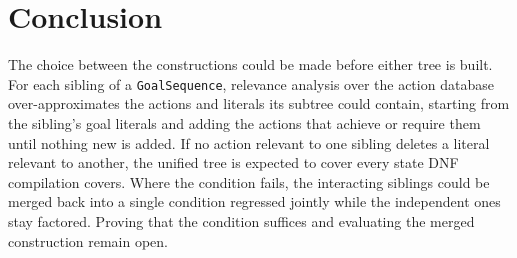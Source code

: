 \chapter{Conclusion}
\label{ch:conclusion}
    The choice between the constructions could be made before either tree is built.
    For each sibling of a \texttt{GoalSequence}, relevance analysis over the action database over-approximates the actions and literals its subtree could contain, starting from the sibling's goal literals and adding the actions that achieve or require them until nothing new is added.
    If no action relevant to one sibling deletes a literal relevant to another, the unified tree is expected to cover every state DNF compilation covers.
    Where the condition fails, the interacting siblings could be merged back into a single condition regressed jointly while the independent ones stay factored.
    Proving that the condition suffices and evaluating the merged construction remain open.
